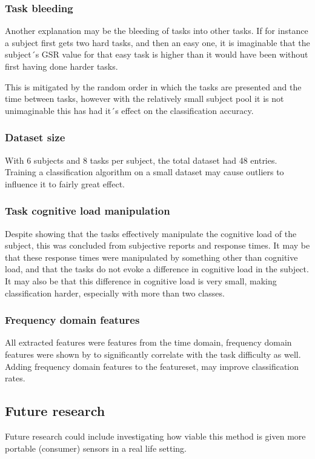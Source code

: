 \documentclass[12pt,leqno,letterpaper]{report} %
\begin{document}
\subsubsection{Task bleeding}
Another explanation may be the bleeding of tasks into other tasks. If for instance a subject first gets two hard tasks, and then an easy one, it is imaginable that the subject´s GSR value for that easy task is higher than it would have been without first having done harder tasks. 

This is mitigated by the random order in which the tasks are presented and the time between tasks, however with the relatively small subject pool it is not unimaginable this has had it´s effect on the classification accuracy.

\subsubsection{Dataset size}
With 6 subjects and 8 tasks per subject, the total dataset had 48 entries. Training a classification algorithm on a small dataset may cause outliers to influence it to fairly great effect.

\subsubsection{Task cognitive load manipulation}
Despite \citep{Nourbakhsh2013} showing that the tasks effectively manipulate the cognitive load of the subject, this was concluded from subjective reports and response times. It may be that these response times were manipulated by something other than cognitive load, and that the tasks do not evoke a difference in cognitive load in the subject. It may also be that this difference in cognitive load is very small, making classification harder, especially with more than two classes.

\subsubsection{Frequency domain features}
All extracted features were features from the time domain, frequency domain features were shown by \citep{Nourbakhsh2012} to significantly correlate with the task difficulty as well. Adding frequency domain features to the featureset, may improve classification rates.

\subsection{Future research}
Future research could include investigating how viable this method is given more portable (consumer) sensors in a real life setting. 





{}
%
\end{document}
